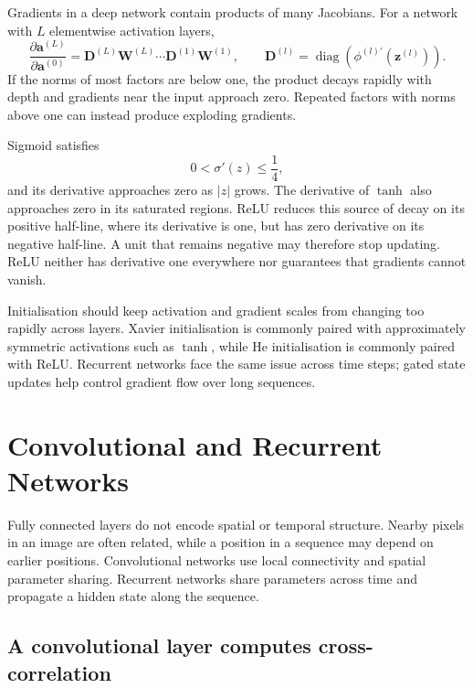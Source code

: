 Gradients in a deep network contain products of many Jacobians. For a network with \(L\) elementwise activation layers,
\[
    \frac{\partial\mathbf{a}^{(L)}}
         {\partial\mathbf{a}^{(0)}}
    =\mathbf{D}^{(L)}\mathbf{W}^{(L)}
     \cdots
     \mathbf{D}^{(1)}\mathbf{W}^{(1)},
    \qquad
    \mathbf{D}^{(l)}
    =\operatorname{diag}\!\left(
      \phi^{(l)\prime}(\mathbf{z}^{(l)})
    \right).
\]
If the norms of most factors are below one, the product decays rapidly with depth and gradients near the input approach zero. Repeated factors with norms above one can instead produce exploding gradients.

Sigmoid satisfies
\[
    0<\sigma'(z)\leq\frac{1}{4},
\]
and its derivative approaches zero as \(|z|\) grows. The derivative of \(\tanh\) also approaches zero in its saturated regions. ReLU reduces this source of decay on its positive half-line, where its derivative is one, but has zero derivative on its negative half-line. A unit that remains negative may therefore stop updating. ReLU neither has derivative one everywhere nor guarantees that gradients cannot vanish.

Initialisation should keep activation and gradient scales from changing too rapidly across layers. Xavier initialisation is commonly paired with approximately symmetric activations such as \(\tanh\), while He initialisation is commonly paired with ReLU. Recurrent networks face the same issue across time steps; gated state updates help control gradient flow over long sequences.


\section{Convolutional and Recurrent Networks}
\label{sec:cnn-rnn}

Fully connected layers do not encode spatial or temporal structure. Nearby pixels in an image are often related, while a position in a sequence may depend on earlier positions. Convolutional networks use local connectivity and spatial parameter sharing. Recurrent networks share parameters across time and propagate a hidden state along the sequence.

\subsection{A convolutional layer computes cross-correlation}

